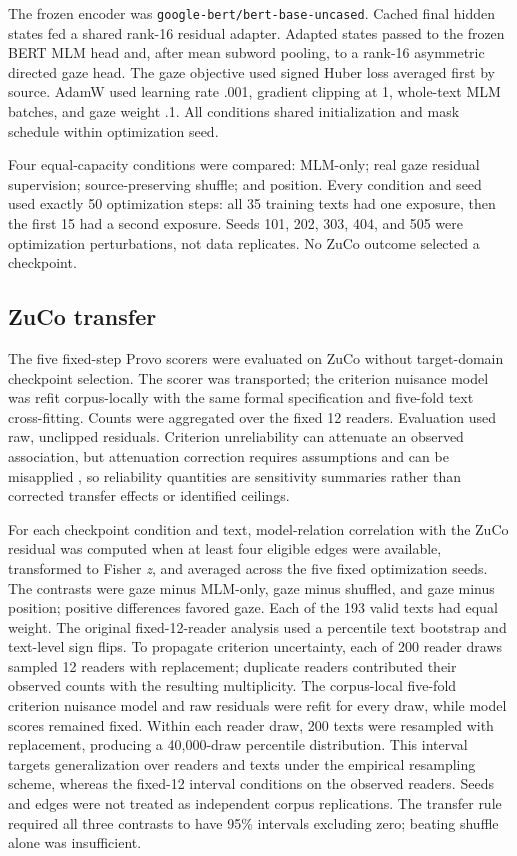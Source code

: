 \documentclass[11pt]{article}
\begin{document}
The frozen encoder was \texttt{google-bert/bert-base-uncased}. Cached final hidden states fed a shared rank-16 residual adapter. Adapted states passed to the frozen BERT MLM head and, after mean subword pooling, to a rank-16 asymmetric directed gaze head. The gaze objective used signed Huber loss averaged first by source. AdamW used learning rate .001, gradient clipping at 1, whole-text MLM batches, and gaze weight .1. All conditions shared initialization and mask schedule within optimization seed.

Four equal-capacity conditions were compared: MLM-only; real gaze residual supervision; source-preserving shuffle; and position. Every condition and seed used exactly 50 optimization steps: all 35 training texts had one exposure, then the first 15 had a second exposure. Seeds 101, 202, 303, 404, and 505 were optimization perturbations, not data replicates. No ZuCo outcome selected a checkpoint.

\subsection{ZuCo transfer}

The five fixed-step Provo scorers were evaluated on ZuCo without target-domain checkpoint selection. The scorer was transported; the criterion nuisance model was refit corpus-locally with the same formal specification and five-fold text cross-fitting. Counts were aggregated over the fixed 12 readers. Evaluation used raw, unclipped residuals. Criterion unreliability can attenuate an observed association, but attenuation correction requires assumptions and can be misapplied \citep{spearman1904,muchinsky1996}, so reliability quantities are sensitivity summaries rather than corrected transfer effects or identified ceilings.

For each checkpoint condition and text, model-relation correlation with the ZuCo residual was computed when at least four eligible edges were available, transformed to Fisher \emph{z}, and averaged across the five fixed optimization seeds. The contrasts were gaze minus MLM-only, gaze minus shuffled, and gaze minus position; positive differences favored gaze. Each of the 193 valid texts had equal weight. The original fixed-12-reader analysis used a percentile text bootstrap and text-level sign flips. To propagate criterion uncertainty, each of 200 reader draws sampled 12 readers with replacement; duplicate readers contributed their observed counts with the resulting multiplicity. The corpus-local five-fold criterion nuisance model and raw residuals were refit for every draw, while model scores remained fixed. Within each reader draw, 200 texts were resampled with replacement, producing a 40,000-draw percentile distribution. This interval targets generalization over readers and texts under the empirical resampling scheme, whereas the fixed-12 interval conditions on the observed readers. Seeds and edges were not treated as independent corpus replications. The transfer rule required all three contrasts to have 95\% intervals excluding zero; beating shuffle alone was insufficient.
\end{document}
